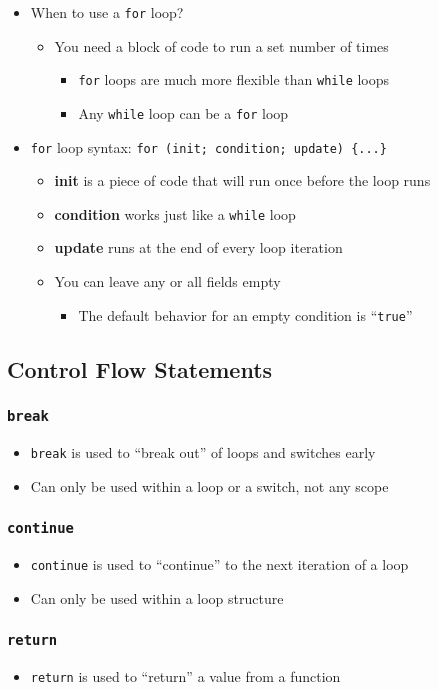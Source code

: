 \documentclass{article}
\begin{document}
\begin{itemize}
	\item When to use a \texttt{for} loop?
	\begin{itemize}
		\item You need a block of code to run a set number of times
		\begin{itemize}
			\item \texttt{for} loops are much more flexible than \texttt{while} loops
			\item Any \texttt{while} loop can be a \texttt{for} loop
		\end{itemize} 
	\end{itemize}
	\item \texttt{for} loop syntax: \texttt{for (init; condition; update) \{...\}} 
	\begin{itemize}
		\item \textbf{init} is a piece of code that will run once before the loop runs
		\item \textbf{condition} works just like a \texttt{while} loop
		\item \textbf{update} runs at the end of every loop iteration
		\item You can leave any or all fields empty \begin{itemize}
			\item The default behavior for an empty condition is ``\texttt{true}''
		\end{itemize}
	\end{itemize}
\end{itemize}

\subsection{Control Flow Statements}

\subsubsection{\texttt{break}}

\begin{itemize}
	\item \texttt{break} is used to ``break out'' of loops and switches early
	\item Can only be used within a loop or a switch, not any scope
\end{itemize}

\subsubsection{\texttt{continue}}

\begin{itemize}
	\item \texttt{continue} is used to ``continue'' to the next iteration of a loop
	\item Can only be used within a loop structure
\end{itemize}

\subsubsection{\texttt{return}}

\begin{itemize}
	\item \texttt{return} is used to ``return'' a value from a function
\end{itemize}

\fail
\end{document}
